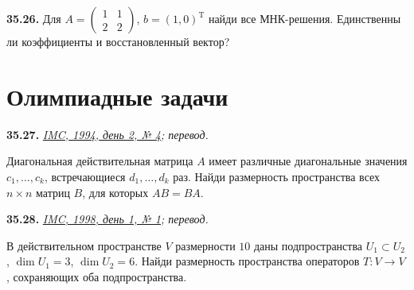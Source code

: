 \noindent\begin{minipage}[t]{\linewidth}\textbf{35.26.}\starmark{} Для \(A=\begin{pmatrix}1&1\\2&2\end{pmatrix}\), \(b=(1,0)^{\mathrm T}\) найди все МНК-решения. Единственны ли коэффициенты и восстановленный вектор?\par\end{minipage}\par
\par{}\section*{Олимпиадные задачи}
\noindent\begin{minipage}[t]{\linewidth}\textbf{35.27.}\starmark{} {\small\itshape\href{https://www.imc-math.org.uk/imc1994/prob_sol.pdf}{IMC, 1994, день 2, № 4}; перевод.}\par Диагональная действительная матрица \(A\) имеет различные диагональные значения \(c_1,\ldots,c_k\), встречающиеся \(d_1,\ldots,d_k\) раз. Найди размерность пространства всех \(n\times n\) матриц \(B\), для которых \(AB=BA\).\par\end{minipage}\par
\noindent\begin{minipage}[t]{\linewidth}\textbf{35.28.}\starmark{} {\small\itshape\href{https://www.imc-math.org.uk/imc1998/prob_sol1.pdf}{IMC, 1998, день 1, № 1}; перевод.}\par В действительном пространстве \(V\) размерности \(10\) даны подпространства \(U_1\subset U_2\), \(\dim U_1=3\), \(\dim U_2=6\). Найди размерность пространства операторов \(T:V\to V\), сохраняющих оба подпространства.\par\end{minipage}\par
\endgroup
